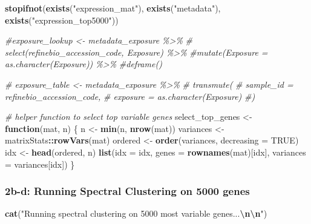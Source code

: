 \documentclass[
]{article}
\newenvironment{Shaded}{\begin{snugshade}}{\end{snugshade}}
\newcommand{\AttributeTok}[1]{\textcolor[rgb]{0.13,0.29,0.53}{#1}}
\newcommand{\CommentTok}[1]{\textcolor[rgb]{0.56,0.35,0.01}{\textit{#1}}}
\newcommand{\ConstantTok}[1]{\textcolor[rgb]{0.56,0.35,0.01}{#1}}
\newcommand{\ControlFlowTok}[1]{\textcolor[rgb]{0.13,0.29,0.53}{\textbf{#1}}}
\newcommand{\FunctionTok}[1]{\textcolor[rgb]{0.13,0.29,0.53}{\textbf{#1}}}
\newcommand{\NormalTok}[1]{#1}
\newcommand{\OtherTok}[1]{\textcolor[rgb]{0.56,0.35,0.01}{#1}}
\newcommand{\SpecialCharTok}[1]{\textcolor[rgb]{0.81,0.36,0.00}{\textbf{#1}}}
\newcommand{\StringTok}[1]{\textcolor[rgb]{0.31,0.60,0.02}{#1}}
\begin{document}
\begin{Shaded}
\begin{Highlighting}[]
\FunctionTok{stopifnot}\NormalTok{(}\FunctionTok{exists}\NormalTok{(}\StringTok{"expression\_mat"}\NormalTok{), }\FunctionTok{exists}\NormalTok{(}\StringTok{"metadata"}\NormalTok{), }\FunctionTok{exists}\NormalTok{(}\StringTok{"expression\_top5000"}\NormalTok{))}


  
  \CommentTok{\#exposure\_lookup \textless{}{-} metadata\_exposure \%\textgreater{}\%}
   \CommentTok{\# select(refinebio\_accession\_code, Exposure) \%\textgreater{}\%}
    \CommentTok{\#mutate(Exposure = as.character(Exposure)) \%\textgreater{}\%}
    \CommentTok{\#deframe()}
  
\CommentTok{\#  exposure\_table \textless{}{-} metadata\_exposure \%\textgreater{}\%}
 \CommentTok{\#   transmute(}
  \CommentTok{\#    sample\_id = refinebio\_accession\_code,}
   \CommentTok{\#   exposure = as.character(Exposure)}
    \CommentTok{\#)}


\CommentTok{\# helper function to select top variable genes}
\NormalTok{select\_top\_genes }\OtherTok{\textless{}{-}} \ControlFlowTok{function}\NormalTok{(mat, n) \{}
\NormalTok{  n }\OtherTok{\textless{}{-}} \FunctionTok{min}\NormalTok{(n, }\FunctionTok{nrow}\NormalTok{(mat))}
\NormalTok{  variances }\OtherTok{\textless{}{-}}\NormalTok{ matrixStats}\SpecialCharTok{::}\FunctionTok{rowVars}\NormalTok{(mat)}
\NormalTok{  ordered }\OtherTok{\textless{}{-}} \FunctionTok{order}\NormalTok{(variances, }\AttributeTok{decreasing =} \ConstantTok{TRUE}\NormalTok{)}
\NormalTok{  idx }\OtherTok{\textless{}{-}} \FunctionTok{head}\NormalTok{(ordered, n)}
  \FunctionTok{list}\NormalTok{(}\AttributeTok{idx =}\NormalTok{ idx, }\AttributeTok{genes =} \FunctionTok{rownames}\NormalTok{(mat)[idx], }\AttributeTok{variances =}\NormalTok{ variances[idx])}
\NormalTok{\}}
\end{Highlighting}
\end{Shaded}

\subsubsection{2b-d: Running Spectral Clustering on 5000
genes}\label{b-d-running-spectral-clustering-on-5000-genes}

\begin{Shaded}
\begin{Highlighting}[]
\FunctionTok{cat}\NormalTok{(}\StringTok{"Running spectral clustering on 5000 most variable genes...}\SpecialCharTok{\textbackslash{}n\textbackslash{}n}\StringTok{"}\NormalTok{)}
\end{Highlighting}
\end{Shaded}
\end{document}
